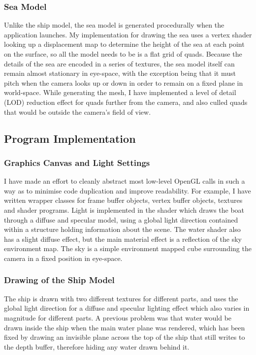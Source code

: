 \documentclass[a4paper,11pt]{article}
\begin{document}
\subsubsection{Sea Model}
Unlike the ship model, the sea model is generated procedurally when the application launches. My implementation for drawing the sea uses a vertex shader looking up a displacement map to determine the height of the sea at each point on the surface, so all the model needs to be is a flat grid of quads. Because the details of the sea are encoded in a series of textures, the sea model itself can remain almost stationary in eye-space, with the exception being that it must pitch when the camera looks up or down in order to remain on a fixed plane in world-space. While generating the mesh, I have implemented a level of detail (LOD) reduction effect for quads further from the camera, and also culled quads that would be outside the camera's field of view.

\subsection{Program Implementation}
\subsubsection{Graphics Canvas and Light Settings}
I have made an effort to cleanly abstract most low-level OpenGL calls in such a way as to minimise code duplication and improve readability. For example, I have written wrapper classes for frame buffer objects, vertex buffer objects, textures and shader programs. Light is implemented in the shader which draws the boat through a diffuse and specular model, using a global light direction contained within a structure holding information about the scene. The water shader also has a slight diffuse effect, but the main material effect is a reflection of the sky environment map. The sky is a simple environment mapped cube surrounding the camera in a fixed position in eye-space.

\subsubsection{Drawing of the Ship Model}
The ship is drawn with two different textures for different parts, and uses the global light direction for a diffuse and specular lighting effect which also varies in magnitude for different parts. A previous problem was that water would be drawn inside the ship when the main water plane was rendered, which has been fixed by drawing an invisible plane across the top of the ship that still writes to the depth buffer, therefore hiding any water drawn behind it.
\end{document}
